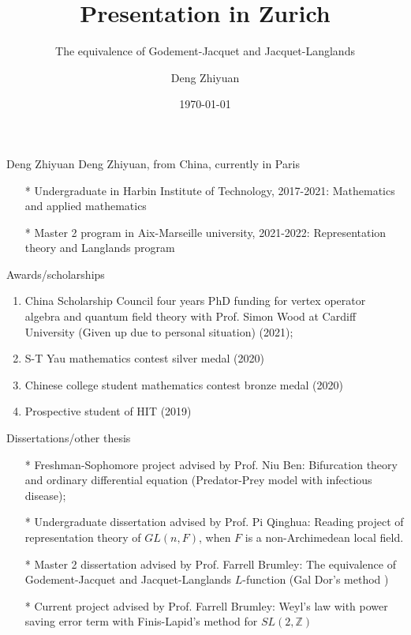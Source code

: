 \documentclass[aspectratio=169]{beamer}
\author{Deng Zhiyuan}
\title{Presentation in Zurich}
\subtitle{The equivalence of Godement-Jacquet and Jacquet-Langlands }
\date{\today}
\theoremstyle{plain}
\theoremstyle{definition}
\theoremstyle{remark}
\begin{document}
\frame[plain]{\titlepage}

\begin{frame}{Deng Zhiyuan}
    Deng Zhiyuan, from China, currently in Paris
    \begin{enumerate}
        \item[*] Undergraduate in Harbin Institute of Technology, 2017-2021: Mathematics and applied mathematics
        \item[*] Master 2 program in Aix-Marseille university, 2021-2022: Representation theory and Langlands program
    \end{enumerate}
\end{frame}
\begin{frame}{Awards/scholarships}
    \begin{enumerate}
        \item China Scholarship Council four years PhD funding for vertex operator algebra and quantum field theory  with Prof. Simon Wood at Cardiff University (Given up due to personal situation) (2021);
        \item S-T Yau mathematics contest silver medal (2020)
        \item Chinese college student mathematics contest bronze medal (2020)
        \item Prospective student of HIT (2019)
        

    \end{enumerate}
\end{frame}
\begin{frame}{Dissertations/other thesis}
    \begin{enumerate}
        \item[*] Freshman-Sophomore project advised by Prof. Niu Ben: Bifurcation  theory and ordinary differential equation (Predator-Prey model with infectious disease);
        \item[*] Undergraduate dissertation advised by Prof. Pi Qinghua: Reading project of representation theory of $GL(n, F)$, when $F$ is a non-Archimedean local field.
        \item[*] Master 2 dissertation advised by Prof. Farrell Brumley: The equivalence of Godement-Jacquet and Jacquet-Langlands $L$-function (Gal Dor's method \cite{dor2020exotic})
        \item[*] Current project advised by Prof. Farrell Brumley: Weyl's law with power saving error term with Finis-Lapid's method for $SL(2,\mathbb{Z})$ \cite{finis2021remainder}
    \end{enumerate}
\end{frame}
\end{document}
